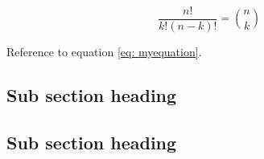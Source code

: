 \begin{equation}
\frac{n!}{k!(n-k)!} = \binom{n}{k}
\label{eq: myequation}
\end{equation}

Reference to equation \autoref{eq: myequation}.

\subsection{Sub section heading}
\lipsum[1-2]

\subsection{Sub section heading}
\lipsum[1-2]